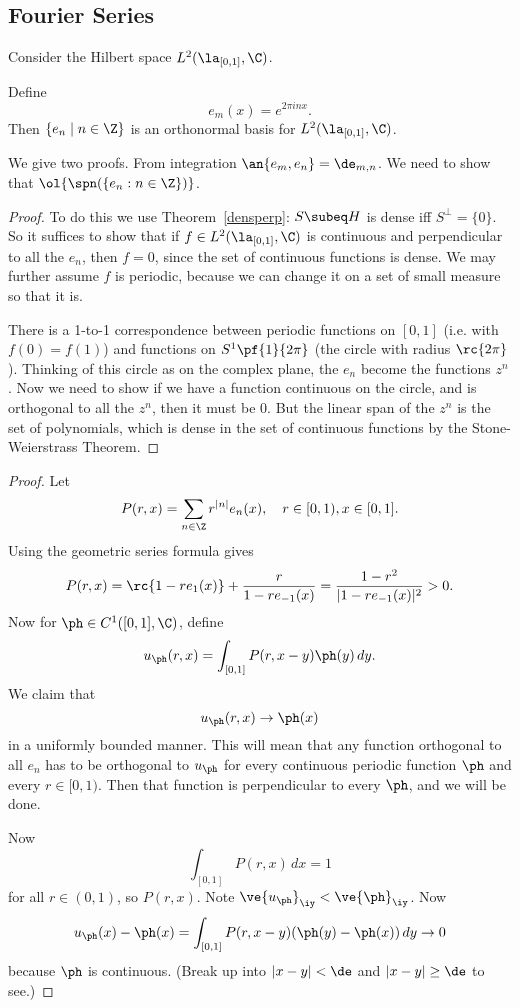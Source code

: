 
\subsection{Fourier Series}
Consider the Hilbert space $L^2(\la_{[0,1]},\C)$.
\begin{thm}
Define
\[
e_m(x)=e^{2\pi i nx}.
\]
Then $\{e_n\mid n\in\Z\}$ is an orthonormal basis for $L^2(\la_{[0,1]},\C)$.
\end{thm}
We give two proofs. From integration $\an{e_m,e_n}=\de_{m,n}$. We need to show that $\ol{\spn(\{e_n:n\in \Z\})}$. 
\begin{proof}
To do this we use Theorem~\ref{densperp}: $S\subeq H$ is dense iff $S^{\perp}=\{0\}$. So it suffices to show that if $f\in L^2(\la_{[0,1]},\C)$ is continuous and perpendicular to all the $e_n$, then $f=0$, since the set of continuous functions is dense. 
We may further assume $f$ is periodic, because we can change it on a set of small measure so that it is.

There is a 1-to-1 correspondence between periodic functions on $[0,1]$ (i.e. with $f(0)=f(1)$) and functions on $S^{1}\pf{1}{2\pi}$ (the circle with radius $\rc{2\pi}$). Thinking of this circle as on the complex plane, the $e_n$ become the functions $z^n$. Now we need to show if we have a function continuous on the circle, and is orthogonal to all the $z^n$, then it must be 0. But the linear span of the $z^n$ is the set of polynomials, which is dense in the set of continuous functions by the Stone-Weierstrass Theorem.
\end{proof}
\begin{proof}
Let 
\[
P(r,x)=\sum_{n\in \Z} r^{|n|}e_n(x),\quad r\in [0,1),x\in [0,1].
\]
Using the geometric series formula gives
\[
P(r,x)=\rc{1-re_1(x)}+\frac{r}{1-re_{-1}(x)}=\frac{1-r^2}{|1-re_{-1}(x)|^2}>0.
\]
Now for $\ph\in C^1([0,1],\C)$, define
\[
u_{\ph}(r,x)=\int_{[0,1]}P(r,x-y)\ph(y)\,dy.
\]
We claim that \[u_{\ph}(r,x)\to \ph(x)\] in a uniformly bounded manner. This will mean that any function orthogonal to all $e_n$ has to be orthogonal to $u_{\ph}$ for every continuous periodic function $\ph$ %
and every $r\in[0,1)$. Then that function is perpendicular to every $\ph$, and we will be done.

Now
\[
\int_{[0,1]} P(r,x)\,dx=1
\]
for all $r\in (0,1)$, so $P(r,x)$. 
Note $\ve{u_{\ph}}_{\iy}<\ve{\ph}_{\iy}$. Now
\[
u_{\ph}(x)-\ph(x)=\int_{[0,1]}P(r,x-y)(\ph(y)-\ph(x))\,dy\to 0
\]
because $\ph$ is continuous. (Break up into $|x-y|<\de$ and $|x-y|\ge \de$ to see.)
\end{proof}
